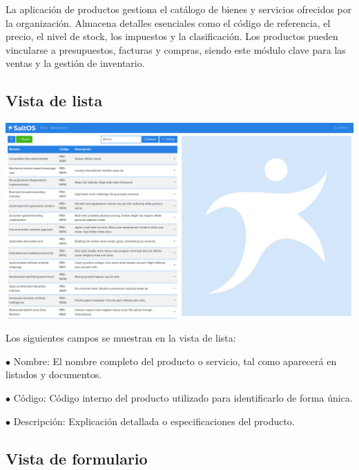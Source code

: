\documentclass[a4paper]{article}
\begin{document}
La aplicación de productos gestiona el catálogo de bienes y servicios ofrecidos por la organización.
Almacena detalles esenciales como el código de referencia, el precio, el nivel de stock, los impuestos y la clasificación.
Los productos pueden vincularse a presupuestos, facturas y compras, siendo este módulo clave para las ventas y la gestión de inventario.

\hypertarget{toc153}{}
\subsection{Vista de lista}

\begin{center}\includegraphics[width=1\textwidth]{../ujest/snaps/test-screenshots-js-screenshots-sales-products-list-es-es-1-snap.png}\end{center}

Los siguientes campos se muestran en la vista de lista:

\begin{compactitem}
\item[\color{myblue}$\bullet$] Nombre: El nombre completo del producto o servicio, tal como aparecerá en listados y documentos.
\item[\color{myblue}$\bullet$] Código: Código interno del producto utilizado para identificarlo de forma única.
\item[\color{myblue}$\bullet$] Descripción: Explicación detallada o especificaciones del producto.
\end{compactitem}

\hypertarget{toc154}{}
\subsection{Vista de formulario}
\end{document}
